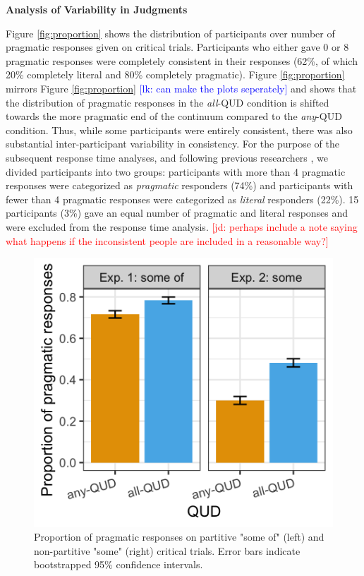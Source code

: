 \documentclass[10pt,letterpaper]{article}
\newcommand{\jd}[1]{\textcolor{Red}{[jd: #1]}}
\newcommand{\lk}[1]{\textcolor{Blue}{[lk: #1]}}
\newcommand{\figref}[1]{Figure \ref{#1}}
\begin{document}
\noindent \textbf{Analysis of Variability in Judgments} 

\figref{fig:proportion} shows the distribution of participants over number of pragmatic responses given on critical trials. Participants who either gave 0 or 8 pragmatic responses were completely consistent in their responses (62\%, of which 20\% completely literal and 80\% completely pragmatic). \figref{fig:proportion} mirrors \figref{fig:proportion} \lk{can make the plots seperately} and shows that the distribution of pragmatic responses in the \emph{all}-QUD condition is shifted towards the more pragmatic end of the continuum compared to the \emph{any}-QUD condition. Thus, while some participants were entirely consistent, there was also substantial inter-participant variability in consistency. For the purpose of the subsequent response time analyses, and following previous researchers \cite{BottNoveck2004,Degen2015}, we divided participants into two groups:  participants with more than 4 pragmatic responses were categorized as \emph{pragmatic} responders (74\%) and participants with fewer than 4 pragmatic responses were categorized as \emph{literal} responders (22\%). 15 participants (3\%) gave an equal number of pragmatic and literal responses and were excluded from the response time analysis. \jd{perhaps include a note saying what happens if the inconsistent people are included in a reasonable way?}

\begin{figure}
\centering
  \includegraphics[width=.8\columnwidth]{plots/judgements.png}
  \caption{Proportion of pragmatic responses on partitive "some of" (left) and non-partitive "some" (right) critical trials. Error bars indicate bootstrapped 95\% confidence intervals. \label{fig:judgments}}
  \end{figure}
  
\end{document}
